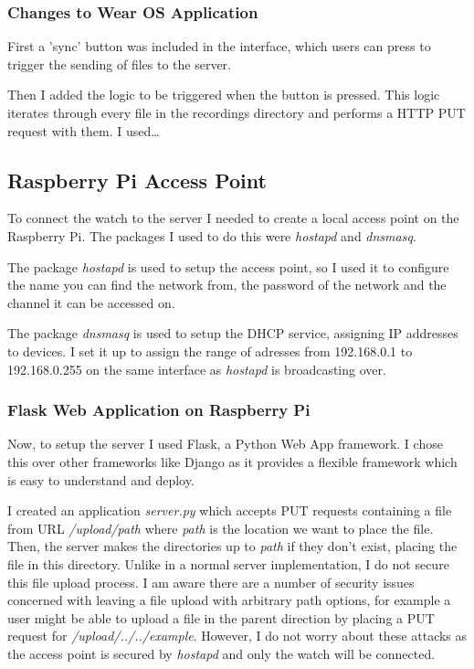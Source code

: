 \documentclass[12pt,a4paper,twoside,openright]{report}
\begin{document}
\subsubsection{Changes to Wear OS Application}

First a 'sync' button was included in the interface, which users can press to
trigger the sending of files to the server.

Then I added the logic to be triggered when the button is pressed. This logic
iterates through every file in the recordings directory and performs a HTTP
PUT request with them. I used\ldots

\subsection{Raspberry Pi Access Point}

To connect the watch to the server I needed to create a local access point on the
Raspberry Pi. The
packages I used to do this were \emph{hostapd} and \emph{dnsmasq}. 

The package \emph{hostapd} is used to setup the access point, so I used it to configure
the name you can find the network from, the password of the network and the
channel it can be accessed on. 

The package \emph{dnsmasq} is used to setup the DHCP service, assigning IP
addresses to devices. I set it up to assign the range of adresses from 192.168.0.1 to
192.168.0.255 on the same interface as \emph{hostapd} is broadcasting over.

\subsubsection{Flask Web Application on Raspberry Pi}

Now, to setup the server I used Flask, a Python Web App framework. I chose
this over other frameworks like Django as it provides a flexible framework
which is easy to understand and deploy.

I created an application \emph{server.py} which
accepts PUT requests containing a file from URL \emph{/upload/path} where
\emph{path} is the location we want to place the file. Then, the server
makes the directories up to \emph{path} if they don't exist, placing the file
in this directory. Unlike in a normal server implementation, I do not secure
this file upload process. I am aware there are a number of security issues
concerned with leaving a file upload with arbitrary path options, for example
a user might be able to upload a file in the parent direction by placing a PUT
request for \emph{/upload/../../example}. However, I do not worry about these
attacks as the access point is secured by \emph{hostapd} and only the watch
will be connected.
\end{document}
